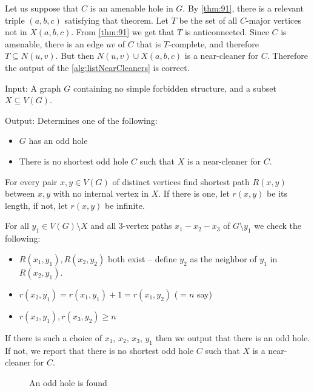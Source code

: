 Let us suppose that $C$ is an amenable hole in $G$. By \cref{thm:91}, there is a relevant triple $(a, b, c)$ satisfying that theorem. Let $T$ be the set of all $C$-major vertices not in $X(a,b,c)$. From \cref{thm:91} we get that $T$ is anticonnected. Since $C$ is amenable, there is an edge $uv$ of $C$ that is $T$-complete, and therefore $T \subseteq N(u, v)$. But then $N(u, v) \cup X(a, b, c)$ is a near-cleaner for $C$. Therefore the output of the \cref{alg:listNearCleaners} is correct.

\begin{alg}
	\label{alg:testNearCleaner}
	Input: A graph $G$ containing no simple forbidden structure, and a subset $X \subseteq V(G)$.

	\noindent Output: Determines one of the following:
	\begin{itemize}
		\item $G$ has an odd hole
		\item There is no shortest odd hole $C$ such that $X$ is a near-cleaner for $C$.
	\end{itemize}
\end{alg}
\begin{algtext2}
	For every pair $x, y \in V(G)$ of distinct vertices find shortest path $R(x, y)$ between $x, y$ with no internal vertex in $X$. If there is one, let $r(x, y)$ be its length, if not, let $r(x, y)$ be infinite.

	For all $y_1 \in V(G)\setminus X$ and all 3-vertex paths $x_1-x_2-x_3$ of $G\setminus y_1$ we check the following:
	\begin{itemize}
		\item $R(x_1, y_1), R(x_2, y_2)$ both exist -- define $y_2$ as the neighbor of $y_1$ in $R(x_2, y_1)$.
		\item $r(x_2, y_1) = r(x_1, y_1) + 1 = r(x_1, y_2)$ ($=n$ say)
		\item $r(x_3, y_1), r(x_3, y_2) \geq n$
	\end{itemize}

	If there is such a choice of $x_1$, $x_2$, $x_3$, $y_1$ then we output that there is an odd hole. If not, we report that there is no shortest odd hole $C$ such that $X$ is a near-cleaner for $C$.
\end{algtext2}

\begin{wrapfigure}{r}{0.35\textwidth}
	
	\caption{An odd hole is found}%
	\vspace{-0.5cm}
\end{wrapfigure}

